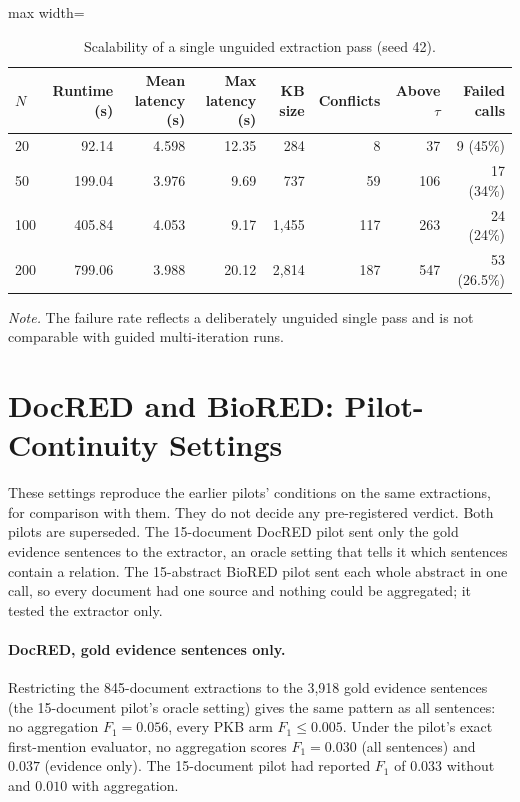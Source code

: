 \documentclass[11pt]{article}
\begin{document}
\begin{table}[htbp]
\centering
\caption{Scalability of a single unguided extraction pass (seed 42).}
\label{tab:s7-scalability}
\begin{adjustbox}{max width=\textwidth}
\begin{tabular}{@{}lrrrrrrr@{}}
\toprule
$N$ & Runtime (s) & Mean latency (s) & Max latency (s) & KB size & Conflicts & Above $\tau$ & Failed calls \\
\midrule
20 & 92.14 & 4.598 & 12.35 & 284 & 8 & 37 & 9 (45\%) \\
50 & 199.04 & 3.976 & 9.69 & 737 & 59 & 106 & 17 (34\%) \\
100 & 405.84 & 4.053 & 9.17 & 1,455 & 117 & 263 & 24 (24\%) \\
200 & 799.06 & 3.988 & 20.12 & 2,814 & 187 & 547 & 53 (26.5\%) \\
\bottomrule
\end{tabular}
\end{adjustbox}

\noindent\emph{Note.} The failure rate reflects a deliberately unguided
single pass and is not comparable with guided multi-iteration runs.
\end{table}

\section{DocRED and BioRED: Pilot-Continuity Settings}
\label{sec:s7}

These settings reproduce the earlier pilots' conditions on the same
extractions, for comparison with them. They do not decide any
pre-registered verdict. Both pilots are superseded. The 15-document
DocRED pilot sent only the gold evidence sentences to the extractor, an
oracle setting that tells it which sentences contain a relation. The
15-abstract BioRED pilot sent each whole abstract in one call, so every
document had one source and nothing could be aggregated; it tested the
extractor only.

\paragraph{DocRED, gold evidence sentences only.} Restricting the 845-document
extractions to the 3,918 gold evidence sentences (the 15-document
pilot's oracle setting) gives the same pattern as all sentences: no
aggregation $F_1=0.056$, every PKB arm $F_1 \le 0.005$. Under the
pilot's exact first-mention evaluator, no aggregation scores $F_1=0.030$
(all sentences) and $0.037$ (evidence only). The 15-document pilot had
reported $F_1$ of $0.033$ without and $0.010$ with aggregation.
\end{document}
